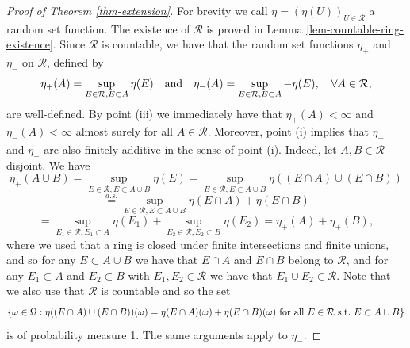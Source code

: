 \documentclass{article}
\theoremstyle{plain}
\theoremstyle{remark}
\begin{document}
\begin{proof}[Proof of Theorem \ref{thm-extension}]
	For brevity we call $\eta=(\eta(U))_{U\in\mathcal{R}}$ a random set function. The existence of $\mathcal{R}$ is proved in Lemma \ref{lem-countable-ring-existence}. Since $\mathcal{R}$ is countable, we have that the random set functions $\eta_+$ and $\eta_-$ on $ \mathcal{R}$, defined by
	\begin{equation*}
		\eta_+(A)=\sup_{E\in \mathcal{R}, E\subset A} \eta(E)\quad\textnormal{and}\quad 	\eta_-(A)=\sup_{E\in \mathcal{R}, E\subset A} -\eta(E),\quad\forall A\in \mathcal{R},
	\end{equation*}
	are well-defined. By point (iii) we immediately have that $\eta_+(A)<\infty$ and $\eta_-(A)<\infty$  almost surely for all $A\in \mathcal{R}$. Moreover, point (i) implies that $\eta_+$ and $\eta_-$ are also finitely additive in the sense of point (i). Indeed, let $A,B\in \mathcal{R}$ disjoint. We have
	\begin{equation*}
		\eta_+(A\cup B)=\sup_{E\in \mathcal{R}, E\subset A\cup B} \eta(E)=\sup_{E\in \mathcal{R}, E\subset A\cup B} \eta((E\cap A)\cup(E\cap B))
	\end{equation*}
	\begin{equation*}
		\stackrel{a.s.}{=}\sup_{E\in \mathcal{R}, E\subset A\cup B} \eta(E\cap A)+\eta(E\cap B)
	\end{equation*}
	\begin{equation*}
		=\sup_{E_1\in \mathcal{R}, E_1\subset A} \eta(E_1)+\sup_{E_2\in \mathcal{R}, E_2\subset B} \eta(E_2)=\eta_+(A)+\eta_+(B),
	\end{equation*}
	where we used that a ring is closed under finite intersections and finite unions, and so for any $E\subset A\cup B$ we have that $E\cap A$ and $ E\cap B$ belong to  $\mathcal{R}$, and for any $E_1\subset A$ and $E_2\subset B$ with $E_1,E_2\in \mathcal{R}$ we have that $E_1\cup E_2\in \mathcal{R}$. Note that we also use that $\mathcal{R}$ is countable and so the set $$\{\omega\in\Omega: \eta((E\cap A)\cup(E\cap B))(\omega)= \eta(E\cap A)(\omega)+\eta(E\cap B)(\omega)\textnormal{ for all $E\in \mathcal{R}$ s.t.~$E\subset A\cup B$}\}$$
	is of probability measure 1. The same arguments apply to $\eta_-$. 
	

\end{proof}
\end{document}
